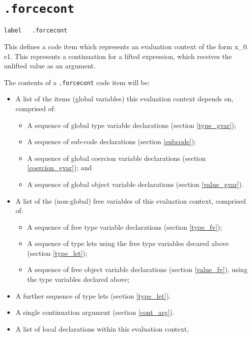 \documentclass{report}
\newcommand\stringcode[1]{\texttt{#1}}
\begin{document}
\section{\stringcode{.forcecont}}

\begin{verbatim}
label	.forcecont
\end{verbatim}

This defines a code item which represents an evaluation context of the form \< \lfloor{}x_0\rfloor \propto \bullet. e1\>.
This represents a continuation for a lifted expression, which receives the unlifted value as an argument.

The contents of a \stringcode{.forcecont} code item will be:
\begin{itemize}
    \item A list of the items (global variables) this evaluation context depends on, comprised of:
        \begin{itemize}
            \item A sequence of global type variable declarations (section \ref{type_gvar});
            \item A sequence of sub-code declarations (section \ref{subcode});
            \item A sequence of global coercion variable declarations (section \ref{coercion_gvar}); and
            \item A sequence of global object variable declarations (section \ref{value_gvar}).
        \end{itemize}
    \item A list of the (non-global) free variables of this evaluation context, comprised of:
        \begin{itemize}
            \item A sequence of free type variable declarations (section \ref{type_fv});
            \item A sequence of type lets using the free type variables decared above (section \ref{type_let});
            \item A sequence of free object variable declarations (section \ref{value_fv}), using the type variables declared above;
        \end{itemize}
    \item A further sequence of type lets (section \ref{type_let}).
    \item A single continuation argument (section \ref{cont_arg}).
    \item A list of local declarations within this evaluation context,

\end{itemize}
\end{document}
